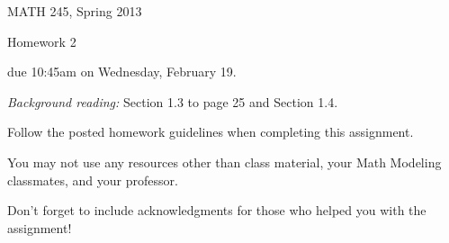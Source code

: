 \documentclass[12pt]{article}
\begin{document}
\pagestyle{empty}



\begin{center}\large 
MATH 245, Spring 2013

{\sc Homework 2}

due 10:45{\sc am} on Wednesday, February 19.
\end{center}

\noindent
{\em Background reading:} Section 1.3 to page 25 and Section 1.4.

\smallskip\noindent
Follow the posted homework guidelines when completing this assignment.  

\smallskip\noindent
You may not use any resources other than class material, your Math Modeling classmates, and your professor.  

\smallskip\noindent
Don't forget to include acknowledgments for those who helped you with the assignment!
\end{document}
